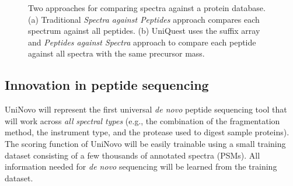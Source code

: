 
\begin{figure}[tbp]
\begin{center}
\caption{\footnotesize 
Two approaches for comparing spectra against a protein database.
(a) Traditional {\em Spectra against Peptides} approach compares each spectrum against all peptides. 
(b) UniQuest uses the suffix array and {\em Peptides against Spectra} approach to compare each peptide against all spectra with the same precursor mass.
}
\label{DBSearchFig}
\end{center}
\end{figure}

\subsection{Innovation in peptide sequencing} 

UniNovo will represent the first universal {\em de novo} peptide sequencing tool that will work across {\em all} {\em spectral types} (e.g., the combination of the fragmentation method, the instrument type, and the protease used to digest sample proteins). The scoring function of UniNovo will be easily trainable using a small training dataset consisting of a few thousands of annotated spectra (PSMs). All information needed for {\em de novo} sequencing will be learned from the training dataset. 








